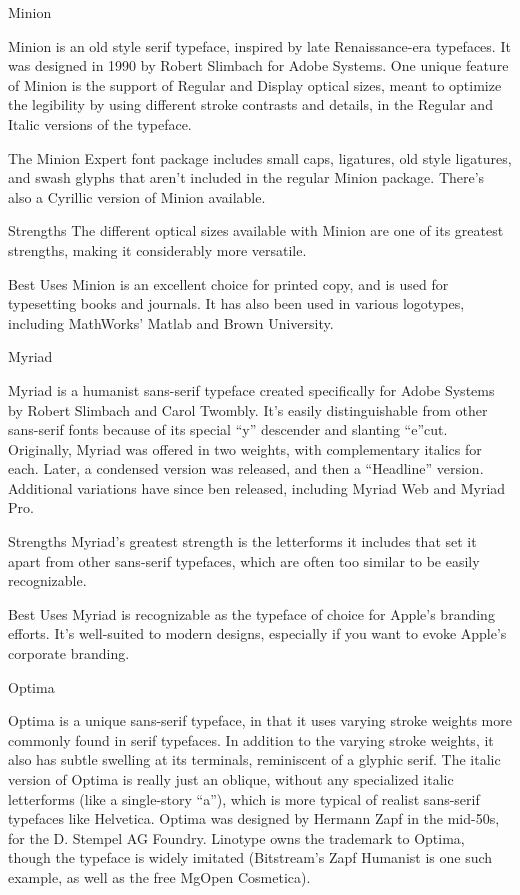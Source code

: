 \documentclass[12pt,a4paper,twocolumn]{book} %
\begin{document}
Minion

Minion is an old style serif typeface, inspired by late Renaissance-era typefaces. It was designed in 1990 by Robert Slimbach for Adobe Systems. One unique feature of Minion is the support of Regular and Display optical sizes, meant to optimize the legibility by using different stroke contrasts and details, in the Regular and Italic versions of the typeface.

The Minion Expert font package includes small caps, ligatures, old style ligatures, and swash glyphs that aren’t included in the regular Minion package. There’s also a Cyrillic version of Minion available.

Strengths
The different optical sizes available with Minion are one of its greatest strengths, making it considerably more versatile.

Best Uses
Minion is an excellent choice for printed copy, and is used for typesetting books and journals. It has also been used in various logotypes, including MathWorks’ Matlab and Brown University.


Myriad

Myriad is a humanist sans-serif typeface created specifically for Adobe Systems by Robert Slimbach and Carol Twombly. It’s easily distinguishable from other sans-serif fonts because of its special “y” descender and slanting “e”cut.
Originally, Myriad was offered in two weights, with complementary italics for each. Later, a condensed version was released, and then a “Headline” version. Additional variations have since ben released, including Myriad Web and Myriad Pro.

Strengths
Myriad’s greatest strength is the letterforms it includes that set it apart from other sans-serif typefaces, which are often too similar to be easily recognizable.

Best Uses
Myriad is recognizable as the typeface of choice for Apple’s branding efforts. It’s well-suited to modern designs, especially if you want to evoke Apple’s corporate branding.


Optima

Optima is a unique sans-serif typeface, in that it uses varying stroke weights more commonly found in serif typefaces. In addition to the varying stroke weights, it also has subtle swelling at its terminals, reminiscent of a glyphic serif. The italic version of Optima is really just an oblique, without any specialized italic letterforms (like a single-story “a”), which is more typical of realist sans-serif typefaces like Helvetica.
Optima was designed by Hermann Zapf in the mid-50s, for the D. Stempel AG Foundry. Linotype owns the trademark to Optima, though the typeface is widely imitated (Bitstream’s Zapf Humanist is one such example, as well as the free MgOpen Cosmetica).
\end{document}
